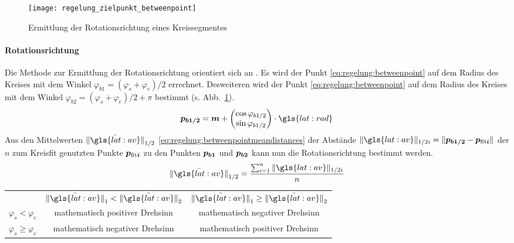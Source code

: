 \begin{figure}[htb]
  \centering
  \texttt{[image: regelung\_zielpunkt\_betweenpoint]}
  \caption{Ermittlung der Rotationsrichtung eines Kreissegmentes}
  \label{fig:regelung:zielpunkt:betweenpoint}
\end{figure}

\paragraph{Rotationsrichtung}
Die Methode zur Ermittlung der Rotationsrichtung orientiert sich an \autocite{drauschkeEchtzeitfaehigeStartpunktalgorithmenFuer2016}. Es wird der Punkt  \eqref{eq:regelung:betweenpoint} auf dem Radius des Kreises mit dem Winkel \(  \varphi_{b1} = (\varphi_s + \varphi_e)/2 \) errechnet.
Desweiteren wird der Punkt  \eqref{eq:regelung:betweenpoint} auf dem Radius des Kreises mit dem Winkel \(  \varphi_{b2} = (\varphi_s + \varphi_e)/2 + \pi \) bestimmt (s. Abb.~\ref{fig:regelung:zielpunkt:betweenpoint}).
\begin{equation} \label{eq:regelung:betweenpoint}
\pnt{p_{b1/2}} = \pnt{m} + 
\begin{pmatrix}
\cos{\varphi_{b1/2}} \\
\sin{\varphi_{b1/2}}
\end{pmatrix}
\cdot \gls{lat:rad}
\end{equation}
Aus den Mittelwerten \( \mean{\nrm{\gls{lat:av}}}_{1/2} \) \eqref{eq:regelung:betweenpointmeandistances} der Abstände \( \nrm{\gls{lat:av}}_{1/2i} = \nrm{\pnt{p_{b1/2}} - \pnt{p_{\text{fit}i}}} \) der \(n\) zum Kreisfit genutzten Punkte \(\boldsymbol{p_{\text{fit}i}}\) zu den Punkten \(\boldsymbol{p_{b1}}\) und \(\boldsymbol{p_{b2}}\) kann nun die Rotationsrichtung bestimmt werden.
\begin{equation} \label{eq:regelung:betweenpointmeandistances}
\mean{\nrm{\gls{lat:av}}}_{1/2} = \frac{\sum_{i=1}^n \nrm{\gls{lat:av}}_{1/2i}}{n} 
\end{equation}
\begin{tabular}{ccc}
& \(\mean{\nrm{\gls{lat:av}}}_{1}<\mean{\nrm{\gls{lat:av}}}_{2}\) & 
\(\mean{\nrm{\gls{lat:av}}}_{1}\geq \mean{\nrm{\gls{lat:av}}}_{2}\) \\
\(\varphi_s<\varphi_e\) &  mathematisch positiver Drehsinn & mathematisch negativer Drehsinn \\
\(\varphi_s\geq \varphi_e\) &  mathematisch negativer Drehsinn & mathematisch positiver Drehsinn
\end{tabular}

